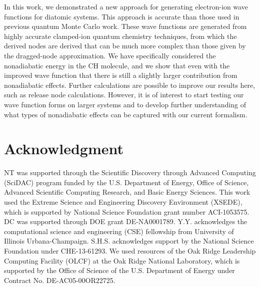 \documentclass[aip,jcp,numerical,reprint]{revtex4-1}
\begin{document}
In this work, we demonstrated a new approach for generating electron-ion wave functions for diatomic systems. This approach is accurate than those used in previous quantum Monte Carlo work.  These wave functions are generated from highly accurate clamped-ion quantum chemistry techniques, from which the derived nodes are derived that can be much more complex than those given by the  dragged-node approximation.  We have specifically considered the nonadiabatic energy in the CH molecule, and we show that even with the improved wave function that there is still a slightly larger contribution from nonadiabatic effects.  Further calculations are possible to improve our results here, such as release node calculations. However, it is of interest to start testing our wave function forms on larger systems and to develop further understanding of what types of nonadiabatic effects can be captured with our current formalism.   


\section{Acknowledgment}
NT was supported through the Scientific Discovery through Advanced Computing (SciDAC) program funded by the U.S. Department of Energy, Office of Science, Advanced Scientific Computing
Research, and Basic Energy Sciences.  This work used the Extreme Science and Engineering Discovery Environment (XSEDE), which is supported by National Science Foundation grant number ACI-1053575.   DC was supported through  DOE grant DE-NA0001789. Y.Y. acknowledges the computational science and engineering (CSE) fellowship from University of Illinois Urbana-Champaign. S.H.S. acknowledges support by the National Science Foundation under CHE-13-61293. We used resources of the Oak Ridge Leadership Computing Facility (OLCF) at the Oak Ridge National Laboratory, which is supported by the Office of Science of the U.S. Department of Energy under Contract No. DE-AC05-00OR22725.


\end{document}
